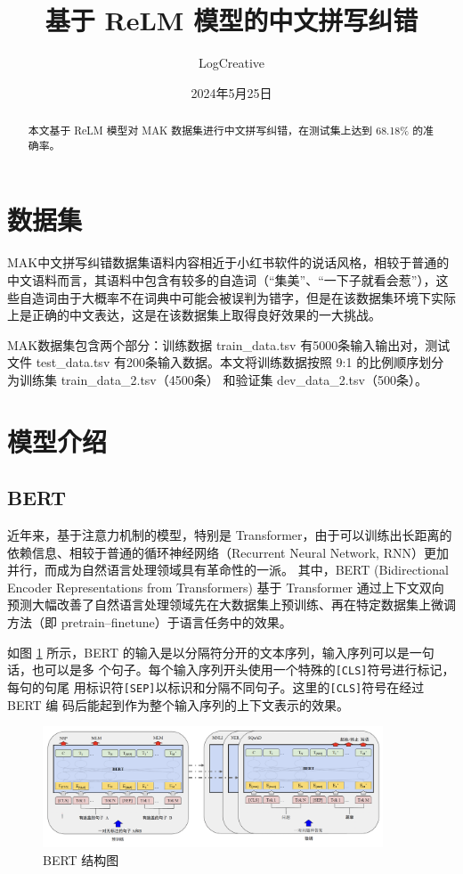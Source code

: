 \documentclass{sjtuarticle}
\title{基于 ReLM 模型的中文拼写纠错}
\author{LogCreative}
\date{2024年5月25日}
\newcommand{\file}[1]{\textsf{#1}}
\begin{document}
\maketitle
\begin{abstract}
    本文基于 ReLM 模型对 MAK 数据集进行中文拼写纠错，在测试集上达到 68.18\% 的准确率。
\end{abstract}
\tableofcontents*
\clearpage
\section{数据集}\label{sec:dataset}
MAK中文拼写纠错数据集语料内容相近于小红书软件的说话风格，相较于普通的中文语料而言，其语料中包含有较多的自造词（“集美”、“一下子就看会惹”），这些自造词由于大概率不在词典中可能会被误判为错字，但是在该数据集环境下实际上是正确的中文表达，这是在该数据集上取得良好效果的一大挑战。

MAK数据集包含两个部分：训练数据 \file{train\_data.tsv} 有5000条输入输出对，测试文件 \file{test\_data.tsv} 有200条输入数据。本文将训练数据按照 9:1 的比例顺序划分为训练集 \file{train\_data\_2.tsv}（4500条） 和验证集 \file{dev\_data\_2.tsv}（500条）。
\section{模型介绍}

\subsection{BERT}

近年来，基于注意力机制的模型，特别是 Transformer\cite{transformer}，由于可以训练出长距离的依赖信息、相较于普通的循环神经网络（Recurrent Neural Network, RNN）更加并行，而成为自然语言处理领域具有革命性的一派。
其中，BERT (Bidirectional Encoder Representations from Transformers)\cite{bert} 基于 Transformer 通过上下文双向预测大幅改善了自然语言处理领域先在大数据集上预训练、再在特定数据集上微调方法（即 pretrain--finetune）于语言任务中的效果。

如图 \ref{fig:bert} 所示，BERT 的输入是以分隔符分开的文本序列，输入序列可以是一句话，也可以是多
个句子。每个输入序列开头使用一个特殊的\verb"[CLS]"符号进行标记，每句的句尾
用标识符\verb"[SEP]"以标识和分隔不同句子。这里的\verb"[CLS]"符号在经过BERT 编
码后能起到作为整个输入序列的上下文表示的效果\cite{nlp}。

\begin{figure}[h]
    \centering
    \includegraphics[width=0.9\textwidth]{bert.png}
    \caption{BERT 结构图\cite{nlp}}
    \label{fig:bert}
\end{figure}
\end{document}
